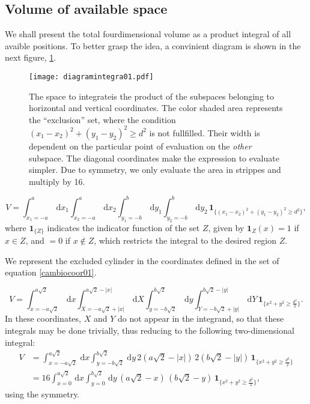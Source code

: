 \documentclass[a4paper,10pt]{article}
\newcommand{\rd}{\, \mathrm{d}}
\newcommand{\indicator}[1]{\mathbf{1}_{ \{   #1 \} } }
\begin{document}
\subsection{Volume of available space}


We shall present the total fourdimensional volume as a product integral
of all avaible positions. To better grasp the idea, a convinient
diagram is shown in the next figure, \ref{diagintegra01}.

\begin{figure}[h]
\texttt{[image: diagramintegra01.pdf]}
\caption{The space to integrateis the product of the subspaces
belonging to horizontal and vertical coordinates. The color
shaded area represents the ``exclusion'' set, where the condition 
$ (x_1-x_2)^2 + (y_1-y_2)^2 \ge d^2 $ is not fullfilled. 
Their width is dependent on the particular point of evaluation
on the \emph{other} subspace. The diagonal coordinates
make the expression to evaluate simpler. Due to 
symmetry, we only evaluate the area in strippes and
multiply by 16.}\label{diagintegra01}
\end{figure}

\begin{equation}
 V = \int_{x_1 = -a}^a \rd x_1 \int_{x_2 = -a}^a \rd x_2 
\int_{y_1 = -b}^b \rd y_1 \int_{y_2 = -b}^b \rd y_2 \, \indicator{ (x_1-x_2)^2 + (y_1-y_2)^2 \ge d^2 },
\end{equation}
where $\indicator{Z}$ indicates the indicator function of the set $Z$, given by $\mathbf{1}_Z (x) = 1$ if $x \in Z$, and $=0$ if $x \notin Z$, which restricts the integral to the desired region $Z$.

We represent the excluded cylinder in the coordinates defined in 
the set of equation \ref{cambiocoor01}. 

\begin{equation}
 V = \int_{x=-a \sqrt{2}}^{a \sqrt{2}} \rd x 
\int_{X=-a \sqrt{2} + |x| }^{a \sqrt{2} - |x|}  \rd X
 \int_{y=-b \sqrt{2}}^{b \sqrt{2}} \rd y
\int_{Y=-b \sqrt{2} + |y| }^{b \sqrt{2}-|y|}  \rd Y
\, \indicator{ x^2 + y^2 \ge \frac{d^2}{2}  }.
\end{equation}
In these coordinates, $X$ and $Y$ do not appear in the integrand, so that these integrals may be done trivially, thus reducing to the following two-dimensional integral:
\begin{align}
 V &= \int_{x=-a \sqrt{2}}^{a \sqrt{2}} \rd x  \int_{y=-b \sqrt{2}}^{b \sqrt{2}} \rd y
\, 2 \left( a \sqrt{2} - |x| \right) \, 2 \left( b \sqrt{2} - |y| \right) \,  \indicator{ x^2 + y^2 \ge \frac{d^2}{2} } \\
&= 16 \int_{x=0}^{a \sqrt{2}} \rd x  \int_{y=0}^{b \sqrt{2}} \rd y
\, \left( a \sqrt{2} - x \right) \, \left( b \sqrt{2} - y \right) \,  \indicator{ x^2 + y^2 \ge \frac{d^2}{2} },
\end{align}
using the symmetry.
\end{document}
